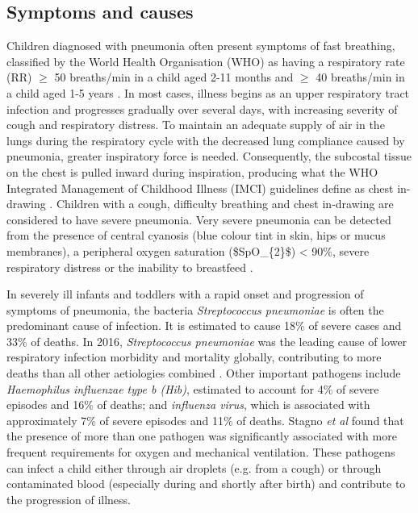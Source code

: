 \subsection{Symptoms and causes}

Children diagnosed with pneumonia often present symptoms of fast breathing, classified by the World Health Organisation (WHO) as having a respiratory rate (RR) $\geq$
50 breaths/min in a child aged 2-11 months and $\geq$ 40 breaths/min in a child aged 1-5 years \cite{world2013pocket}. In most cases, illness begins as an upper respiratory tract infection and progresses gradually over several days, with increasing severity of cough and respiratory distress. To maintain an adequate supply of air in the lungs during the respiratory cycle with the decreased lung compliance caused by pneumonia, greater inspiratory force is needed. Consequently, the subcostal tissue on the chest is pulled inward during inspiration, producing what the WHO Integrated Management of Childhood Illness (IMCI) guidelines define as chest in-drawing \cite{mccollum2017outpatient}. Children with a cough, difficulty breathing and chest in-drawing are considered to have severe pneumonia. Very severe pneumonia can be detected from the presence of central cyanosis (blue colour tint in skin, hips or mucus membranes), a peripheral oxygen saturation (\gls{$SpO_{2}$}) < 90\%, severe respiratory distress or the inability to breastfeed  \cite{ayieko2007case}. 

In severely ill infants and toddlers with a rapid onset and progression of symptoms of pneumonia, the bacteria \textit{Streptococcus pneumoniae} is often the predominant cause of infection. It is estimated to cause 18\% of severe cases and 33\% of deaths. In 2016, \textit{Streptococcus pneumoniae} was the leading cause of lower respiratory infection morbidity and mortality globally, contributing to more deaths than all other aetiologies combined \cite{troeger2018estimates}. Other important pathogens include \textit{Haemophilus influenzae type b (Hib)}, estimated to account for 4\% of severe episodes and 16\% of deaths; and \textit{influenza virus}, which is associated with approximately 7\% of severe episodes and 11\% of deaths. Stagno \textit{et al} \cite{stagno1981infant} found that the presence of more than one pathogen was significantly associated with more frequent requirements for oxygen and mechanical ventilation. These pathogens can infect a child either through air droplets (e.g. from a cough) or through contaminated blood (especially during and shortly after birth) and contribute to the progression of illness.
 
